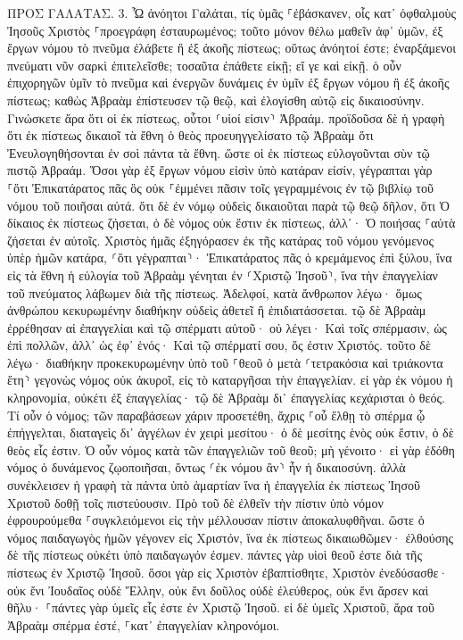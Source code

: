 \documentclass[twoside, 9pt]{extreport}
\begin{document}
ΠΡΟΣ ΓΑΛΑΤΑΣ.
3.
Ὦ ἀνόητοι Γαλάται, τίς ὑμᾶς ⸀ἐβάσκανεν, οἷς κατ᾽ ὀφθαλμοὺς Ἰησοῦς Χριστὸς ⸀προεγράφη ἐσταυρωμένος; 
τοῦτο μόνον θέλω μαθεῖν ἀφ᾽ ὑμῶν, ἐξ ἔργων νόμου τὸ πνεῦμα ἐλάβετε ἢ ἐξ ἀκοῆς πίστεως; 
οὕτως ἀνόητοί ἐστε; ἐναρξάμενοι πνεύματι νῦν σαρκὶ ἐπιτελεῖσθε; 
τοσαῦτα ἐπάθετε εἰκῇ; εἴ γε καὶ εἰκῇ. 
ὁ οὖν ἐπιχορηγῶν ὑμῖν τὸ πνεῦμα καὶ ἐνεργῶν δυνάμεις ἐν ὑμῖν ἐξ ἔργων νόμου ἢ ἐξ ἀκοῆς πίστεως; 
καθὼς Ἀβραὰμ ἐπίστευσεν τῷ θεῷ, καὶ ἐλογίσθη αὐτῷ εἰς δικαιοσύνην. 
Γινώσκετε ἄρα ὅτι οἱ ἐκ πίστεως, οὗτοι ⸂υἱοί εἰσιν⸃ Ἀβραάμ. 
προϊδοῦσα δὲ ἡ γραφὴ ὅτι ἐκ πίστεως δικαιοῖ τὰ ἔθνη ὁ θεὸς προευηγγελίσατο τῷ Ἀβραὰμ ὅτι Ἐνευλογηθήσονται ἐν σοὶ πάντα τὰ ἔθνη. 
ὥστε οἱ ἐκ πίστεως εὐλογοῦνται σὺν τῷ πιστῷ Ἀβραάμ. 
Ὅσοι γὰρ ἐξ ἔργων νόμου εἰσὶν ὑπὸ κατάραν εἰσίν, γέγραπται γὰρ ⸀ὅτι Ἐπικατάρατος πᾶς ὃς οὐκ ⸀ἐμμένει πᾶσιν τοῖς γεγραμμένοις ἐν τῷ βιβλίῳ τοῦ νόμου τοῦ ποιῆσαι αὐτά. 
ὅτι δὲ ἐν νόμῳ οὐδεὶς δικαιοῦται παρὰ τῷ θεῷ δῆλον, ὅτι Ὁ δίκαιος ἐκ πίστεως ζήσεται, 
ὁ δὲ νόμος οὐκ ἔστιν ἐκ πίστεως, ἀλλ᾽· Ὁ ποιήσας ⸀αὐτὰ ζήσεται ἐν αὐτοῖς. 
Χριστὸς ἡμᾶς ἐξηγόρασεν ἐκ τῆς κατάρας τοῦ νόμου γενόμενος ὑπὲρ ἡμῶν κατάρα, ⸂ὅτι γέγραπται⸃· Ἐπικατάρατος πᾶς ὁ κρεμάμενος ἐπὶ ξύλου, 
ἵνα εἰς τὰ ἔθνη ἡ εὐλογία τοῦ Ἀβραὰμ γένηται ἐν ⸂Χριστῷ Ἰησοῦ⸃, ἵνα τὴν ἐπαγγελίαν τοῦ πνεύματος λάβωμεν διὰ τῆς πίστεως. 
Ἀδελφοί, κατὰ ἄνθρωπον λέγω· ὅμως ἀνθρώπου κεκυρωμένην διαθήκην οὐδεὶς ἀθετεῖ ἢ ἐπιδιατάσσεται. 
τῷ δὲ Ἀβραὰμ ἐρρέθησαν αἱ ἐπαγγελίαι καὶ τῷ σπέρματι αὐτοῦ· οὐ λέγει· Καὶ τοῖς σπέρμασιν, ὡς ἐπὶ πολλῶν, ἀλλ᾽ ὡς ἐφ᾽ ἑνός· Καὶ τῷ σπέρματί σου, ὅς ἐστιν Χριστός. 
τοῦτο δὲ λέγω· διαθήκην προκεκυρωμένην ὑπὸ τοῦ ⸀θεοῦ ὁ μετὰ ⸂τετρακόσια καὶ τριάκοντα ἔτη⸃ γεγονὼς νόμος οὐκ ἀκυροῖ, εἰς τὸ καταργῆσαι τὴν ἐπαγγελίαν. 
εἰ γὰρ ἐκ νόμου ἡ κληρονομία, οὐκέτι ἐξ ἐπαγγελίας· τῷ δὲ Ἀβραὰμ δι᾽ ἐπαγγελίας κεχάρισται ὁ θεός. 
Τί οὖν ὁ νόμος; τῶν παραβάσεων χάριν προσετέθη, ἄχρις ⸀οὗ ἔλθῃ τὸ σπέρμα ᾧ ἐπήγγελται, διαταγεὶς δι᾽ ἀγγέλων ἐν χειρὶ μεσίτου· 
ὁ δὲ μεσίτης ἑνὸς οὐκ ἔστιν, ὁ δὲ θεὸς εἷς ἐστιν. 
Ὁ οὖν νόμος κατὰ τῶν ἐπαγγελιῶν τοῦ θεοῦ; μὴ γένοιτο· εἰ γὰρ ἐδόθη νόμος ὁ δυνάμενος ζῳοποιῆσαι, ὄντως ⸂ἐκ νόμου ἂν⸃ ἦν ἡ δικαιοσύνη. 
ἀλλὰ συνέκλεισεν ἡ γραφὴ τὰ πάντα ὑπὸ ἁμαρτίαν ἵνα ἡ ἐπαγγελία ἐκ πίστεως Ἰησοῦ Χριστοῦ δοθῇ τοῖς πιστεύουσιν. 
Πρὸ τοῦ δὲ ἐλθεῖν τὴν πίστιν ὑπὸ νόμον ἐφρουρούμεθα ⸀συγκλειόμενοι εἰς τὴν μέλλουσαν πίστιν ἀποκαλυφθῆναι. 
ὥστε ὁ νόμος παιδαγωγὸς ἡμῶν γέγονεν εἰς Χριστόν, ἵνα ἐκ πίστεως δικαιωθῶμεν· 
ἐλθούσης δὲ τῆς πίστεως οὐκέτι ὑπὸ παιδαγωγόν ἐσμεν. 
πάντες γὰρ υἱοὶ θεοῦ ἐστε διὰ τῆς πίστεως ἐν Χριστῷ Ἰησοῦ. 
ὅσοι γὰρ εἰς Χριστὸν ἐβαπτίσθητε, Χριστὸν ἐνεδύσασθε· 
οὐκ ἔνι Ἰουδαῖος οὐδὲ Ἕλλην, οὐκ ἔνι δοῦλος οὐδὲ ἐλεύθερος, οὐκ ἔνι ἄρσεν καὶ θῆλυ· ⸀πάντες γὰρ ὑμεῖς εἷς ἐστε ἐν Χριστῷ Ἰησοῦ. 
εἰ δὲ ὑμεῖς Χριστοῦ, ἄρα τοῦ Ἀβραὰμ σπέρμα ἐστέ, ⸀κατ᾽ ἐπαγγελίαν κληρονόμοι. 
\end{document}
